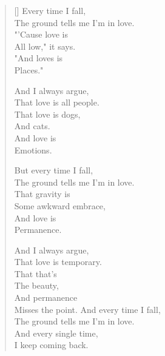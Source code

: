 \begin{verse}[\textwidth]
Every time I fall,\\
\vin The ground tells me I'm in love.\\
"'Cause love is\\
\vin All low," it says.\\
"And loves is\\
\vin Places."

And I always argue,\\
\vin That love is all people.\\
That love is dogs,\\
\vin And cats.\\
And love is\\
\vin Emotions.

But every time I fall,\\
\vin The ground tells me I'm in love.\\
That gravity is\\
\vin Some awkward embrace,\\
And love is\\
\vin Permanence.

And I always argue,\\
\vin That love is temporary.\\
That that's\\
\vin The beauty,\\
And permanence\\
\vin Misses the point.
\newpage
And every time I fall,\\
\vin The ground tells me I'm in love.\\
And every single time,\\
\vin I keep coming back.
\end{verse}
